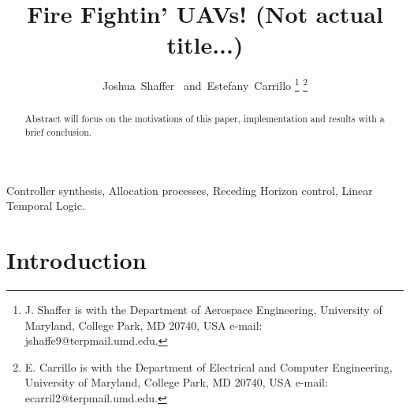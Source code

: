 \documentclass[journal]{IEEEtran}
\begin{document}
\title{Fire Fightin' UAVs! (Not actual title...)}



\author{Joshua~Shaffer~
		and~Estefany~Carrillo%
\thanks{J. Shaffer is with the Department of Aerospace Engineering,
	University of Maryland, College Park,
	MD 20740, USA e-mail: jshaffe9@terpmail.umd.edu.}%
\thanks{E. Carrillo is with the Department of Electrical and Computer Engineering, University of Maryland, College Park,
  MD 20740, USA e-mail: ecarril2@terpmail.umd.edu.}}%



\maketitle

\begin{abstract}
Abstract will focus on the motivations of this paper, implementation and results with a brief conclusion.
\end{abstract}

\begin{IEEEkeywords}
Controller synthesis, Allocation processes, Receding Horizon control, Linear Temporal Logic.
\end{IEEEkeywords}


%
\IEEEpeerreviewmaketitle

\section{Introduction}
% 
% 
% 
% 
\end{document}
